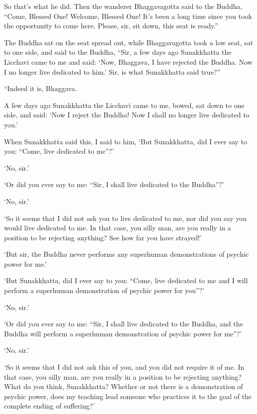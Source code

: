 \documentclass[12pt,openany]{book}%
\begin{document}
So that’s what he did. Then the wanderer Bhaggavagotta said to the Buddha, “Come, Blessed One! Welcome, Blessed One! It’s been a long time since you took the opportunity to come here. Please, sir, sit down, this seat is ready.” 

The Buddha sat on the seat spread out, while Bhaggavagotta took a low seat, sat to one side, and said to the Buddha, “Sir, a few days ago Sunakkhatta the Licchavi came to me and said: ‘Now, Bhaggava, I have rejected the Buddha. Now I no longer live dedicated to him.’ Sir, is what Sunakkhatta said true?” 

“Indeed it is, Bhaggava. 

A few days ago Sunakkhatta the Licchavi came to me, bowed, sat down to one side, and said: ‘Now I reject the Buddha! Now I shall no longer live dedicated to you.’ 

When Sunakkhatta said this, I said to him, ‘But Sunakkhatta, did I ever say to you: “Come, live dedicated to me”?’ 

‘No, sir.’ 

‘Or did you ever say to me: “Sir, I shall live dedicated to the Buddha”?’ 

‘No, sir.’ 

‘So it seems that I did not ask you to live dedicated to me, nor did you say you would live dedicated to me. In that case, you silly man, are you really in a position to be rejecting anything? See how far you have strayed!’ 

‘But sir, the Buddha never performs any superhuman demonstrations of psychic power for me.’ 

‘But Sunakkhatta, did I ever say to you: “Come, live dedicated to me and I will perform a superhuman demonstration of psychic power for you”?’ 

‘No, sir.’ 

‘Or did you ever say to me: “Sir, I shall live dedicated to the Buddha, and the Buddha will perform a superhuman demonstration of psychic power for me”?’ 

‘No, sir.’ 

‘So it seems that I did not ask this of you, and you did not require it of me. In that case, you silly man, are you really in a position to be rejecting anything? What do you think, Sunakkhatta? Whether or not there is a demonstration of psychic power, does my teaching lead someone who practices it to the goal of the complete ending of suffering?’ 
\end{document}
